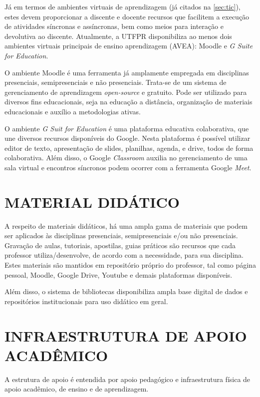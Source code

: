Já em termos de ambientes virtuais de aprendizagem (já citados na \autoref{sec:tic}), estes devem proporcionar a discente e docente recursos que facilitem a execução de atividades síncronas e assíncronas, bem como meios para interação e devolutiva ao discente. Atualmente, a UTFPR disponibiliza ao menos dois ambientes virtuais principais de ensino aprendizagem (AVEA): Moodle e \textit{G Suite for Education}.

O ambiente Moodle é uma ferramenta já amplamente empregada em disciplinas presenciais, semipresenciais e não presenciais. Trata-se de um sistema de gerenciamento de aprendizagem \textit{open-source} e gratuito. Pode ser utilizado para diversos fins educacionais, seja na educação a distância, organização de materiais educacionais e auxílio a metodologias ativas.

O ambiente \textit{G Suit for Education} é uma plataforma educativa colaborativa, que une diversos recursos disponíveis do Google. Nesta plataforma é possível utilizar editor de texto, apresentação de slides, planilhas, agenda, e drive, todos de forma colaborativa. Além disso, o Google \textit{Classroom} auxilia no gerenciamento de uma sala virtual e encontros síncronos podem ocorrer com a ferramenta Google \textit{Meet}.

\section{MATERIAL DIDÁTICO}

A respeito de materiais didáticos, há uma ampla gama de materiais que podem ser aplicados às disciplinas presenciais, semipresenciais e/ou não presenciais. Gravação de aulas, tutoriais, apostilas, guias práticos são recursos que cada professor utiliza/desenvolve, de acordo com a necessidade, para sua disciplina. Estes materiais são mantidos em repositório próprio do professor, tal como página pessoal, Moodle, Google Drive, Youtube e demais plataformas disponíveis.

Além disso, o sistema de bibliotecas disponibiliza ampla base digital de dados e repositórios institucionais para uso didático em geral.

\section{INFRAESTRUTURA DE APOIO ACADÊMICO}

A estrutura de apoio é entendida por apoio pedagógico e infraestrutura física de apoio acadêmico, de ensino e de aprendizagem.

